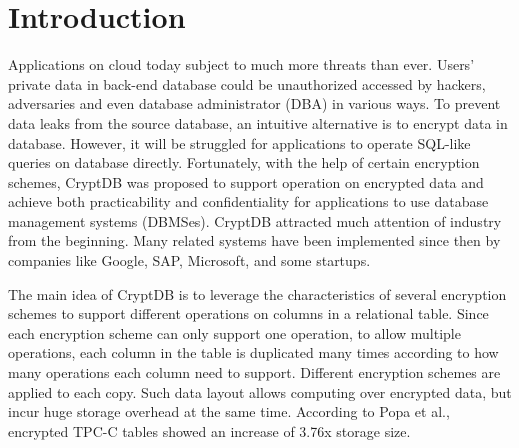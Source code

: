 \section{Introduction}

Applications on cloud today subject to much more threats than ever. Users' private data in back-end database could be unauthorized accessed by hackers, adversaries and even database administrator (DBA) in various ways. To prevent data leaks from the source database, an intuitive alternative is to encrypt data in database. However, it will be struggled for applications to operate SQL-like queries on database directly. Fortunately, with the help of certain encryption schemes, CryptDB \citep{popa2011cryptdb} was proposed to support operation on encrypted data and achieve both practicability and confidentiality for applications to use database management systems (DBMSes). CryptDB attracted much attention of industry from the beginning. Many related systems have been implemented since then by companies like Google, SAP, Microsoft, and some startups\citep{cryptdbsite, kerschbaum2013encrypted}.


The main idea of CryptDB is to leverage the characteristics of several encryption schemes to support different operations on columns in a relational table.  Since each encryption scheme can only support one operation, to allow multiple operations, each column in the table is duplicated many times according to how many operations each column need to support. Different encryption schemes are applied to each copy. Such data layout allows computing over encrypted data, but incur huge storage overhead at the same time. According to Popa et al.\citep{popa2011cryptdb}, encrypted TPC-C tables showed an increase of 3.76x storage size.

